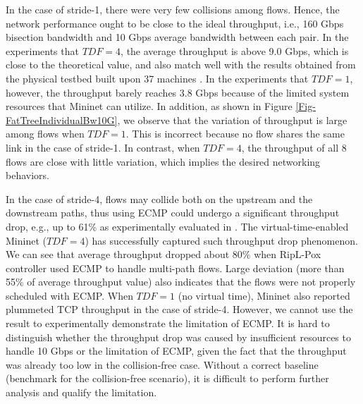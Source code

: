 In the case of stride-1, there were very few collisions among flows. Hence, the network performance ought to be close to the ideal throughput, i.e., 160 Gbps bisection bandwidth and 10 Gbps average bandwidth between each pair. In the experiments that $TDF=4$, the average throughput is above 9.0 Gbps, which is close to the theoretical value, and also match well with the results obtained from the physical testbed built upon 37 machines \cite{Hedera}. In the experiments that $TDF=1$, however, the throughput barely reaches 3.8 Gbps because of the limited system resources that Mininet can utilize. In addition, as shown in Figure \ref{Fig-FatTreeIndividualBw10G}, we observe that the variation of throughput is large among flows when $TDF=1$. This is incorrect because no flow shares the same link in the case of stride-1. In contrast, when $TDF = 4$, the throughput of all 8 flows are close with little variation, which implies the desired networking behaviors. 

In the case of stride-4, flows may collide both on the upstream and the downstream paths, thus using ECMP could undergo a significant throughput drop, e.g., up to 61\% as experimentally evaluated in \cite{Hedera}.  The virtual-time-enabled Mininet ($TDF=4$) has successfully captured such throughput drop phenomenon. We can see that average throughput dropped about 80\% when RipL-Pox controller used ECMP to handle multi-path flows. Large deviation (more than 55\% of average throughput value) also indicates that the flows were not properly scheduled with ECMP. When $TDF=1$ (no virtual time), Mininet also reported plummeted TCP throughput in the case of stride-4. However, we cannot use the result to experimentally demonstrate the limitation of ECMP. It is hard to distinguish whether the throughput drop was caused by insufficient resources to handle 10 Gbps or the limitation of ECMP, given the fact that the throughput was already too low in the collision-free case. Without a correct baseline (benchmark for the collision-free scenario), it is difficult to perform further analysis and qualify the limitation.



